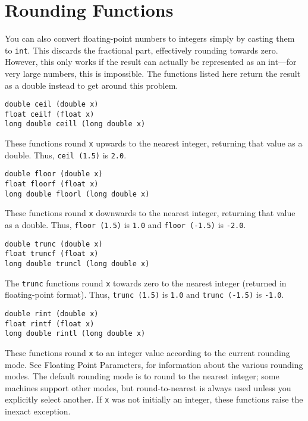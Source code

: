 \documentclass[12pt, titlepage]{article}
\renewcommand{\tt}[1]{\texttt{\small #1}}
\begin{document}
\section{Rounding Functions}

You can also convert floating-point numbers to integers simply by casting them to \tt{int}. This discards the fractional part, effectively rounding towards zero. However, this only works if the result can actually be represented as an int—for very large numbers, this is impossible. The functions listed here return the result as a double instead to get around this problem.

\begin{verbatim}
double ceil (double x)
float ceilf (float x)
long double ceill (long double x)
\end{verbatim}
These functions round \tt{x} upwards to the nearest integer, returning that value as a double. Thus, \tt{ceil (1.5)} is \tt{2.0}.

\begin{verbatim}
double floor (double x)
float floorf (float x)
long double floorl (long double x)
\end{verbatim}
These functions round \tt{x} downwards to the nearest integer, returning that value as a double. Thus, \tt{floor (1.5)} is \tt{1.0} and \tt{floor (-1.5)} is \tt{-2.0}.

\begin{verbatim}
double trunc (double x)
float truncf (float x)
long double truncl (long double x)
\end{verbatim}
The \tt{trunc} functions round \tt{x} towards zero to the nearest integer (returned in floating-point format). Thus, \tt{trunc (1.5)} is \tt{1.0} and \tt{trunc (-1.5)} is \tt{-1.0}.

\begin{verbatim}
double rint (double x)
float rintf (float x)
long double rintl (long double x)
\end{verbatim}
These functions round \tt{x} to an integer value according to the current rounding mode. See Floating Point Parameters, for information about the various rounding modes. The default rounding mode is to round to the nearest integer; some machines support other modes, but round-to-nearest is always used unless you explicitly select another. If \tt{x} was not initially an integer, these functions raise the inexact exception.
\end{document}
